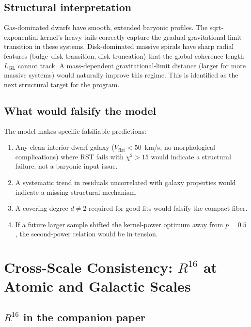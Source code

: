 \documentclass[11pt,a4paper]{article}
\begin{document}
\subsection{Structural interpretation}

Gas-dominated dwarfs have smooth, extended baryonic profiles.
The sqrt-exponential kernel's heavy tails correctly capture the gradual gravitational-limit transition in these systems.
Disk-dominated massive spirals have sharp radial features (bulge--disk transition, disk truncation) that the global coherence length $L_{\mathrm{GL}}$ cannot track.
A mass-dependent gravitational-limit distance (larger for more massive systems) would naturally improve this regime.
This is identified as the next structural target for the program.

\subsection{What would falsify the model}
\label{sec:falsification}

The model makes specific falsifiable predictions:
\begin{enumerate}
\item Any clean-interior dwarf galaxy ($V_{\mathrm{flat}} < 50$~km/s, no morphological complications) where RST fails with $\chi^2 > 15$ would indicate a structural failure, not a baryonic input issue.
\item A systematic trend in residuals uncorrelated with galaxy properties would indicate a missing structural mechanism.
\item A covering degree $d \neq 2$ required for good fits would falsify the compact fiber.
\item If a future larger sample shifted the kernel-power optimum away from $p = 0.5$, the second-power relation would be in tension.
\end{enumerate}

\section{Cross-Scale Consistency: $R^{16}$ at Atomic and Galactic Scales}
\label{sec:cross-scale}

\subsection{$R^{16}$ in the companion paper}
\end{document}
